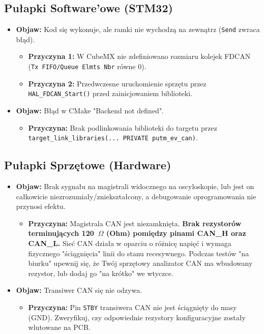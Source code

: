 \documentclass[a4paper,11pt]{article}
\begin{document}
\begin{stm32box}
\subsection*{Pułapki Software'owe (STM32)}
\begin{itemize}
    \item \textbf{Objaw:} Kod się wykonuje, ale ramki nie wychodzą na zewnątrz (\texttt{Send} zwraca błąd).
    \begin{itemize}
        \item \textbf{Przyczyna 1:} W CubeMX nie zdefiniowano rozmiaru kolejek FDCAN (\texttt{Tx FIFO/Queue Elmts Nbr} równe $0$).
        \item \textbf{Przyczyna 2:} Przedwczesne uruchomienie sprzętu przez \texttt{HAL\_FDCAN\_Start()} przed zainicjowaniem biblioteki.
    \end{itemize}
    \item \textbf{Objaw:} Błąd w CMake "Backend not defined".
    \begin{itemize}
        \item \textbf{Przyczyna:} Brak podlinkowania biblioteki do targetu przez \texttt{target\_link\_libraries(... PRIVATE putm\_ev\_can)}.
    \end{itemize}
\end{itemize}
\end{stm32box}

\vspace{1em}

\begin{stm32box}
\subsection*{Pułapki Sprzętowe (Hardware)}
\begin{itemize}
    \item \textbf{Objaw:} Brak sygnału na magistrali widocznego na oscyloskopie, lub jest on całkowicie niezrozumiały/zniekształcony, a debugowanie oprogramowania nie przynosi efektu.
    \begin{itemize}
        \item \textbf{Przyczyna:} Magistrala CAN jest niezamknięta. \textbf{Brak rezystorów terminujących 120~$\Omega$ (Ohm) pomiędzy pinami CAN\_H oraz CAN\_L.} Sieć CAN działa w oparciu o różnicę napięć i wymaga fizycznego "ściągnięcia" linii do stanu recesywnego. Podczas testów "na biurku" upewnij się, że Twój sprzętowy analizator CAN ma wbudowany rezystor, lub dodaj go "na krótko" we wtyczce.
    \end{itemize}
    \item \textbf{Objaw:} Transiwer CAN się nie odzywa.
    \begin{itemize}
        \item \textbf{Przyczyna:} Pin \texttt{STBY} transiwera CAN nie jest ściągnięty do masy (GND). Zweryfikuj, czy odpowiednie rezystory konfiguracyjne zostały wlutowane na PCB.
    \end{itemize}
\end{itemize}
\end{stm32box}
\end{document}
